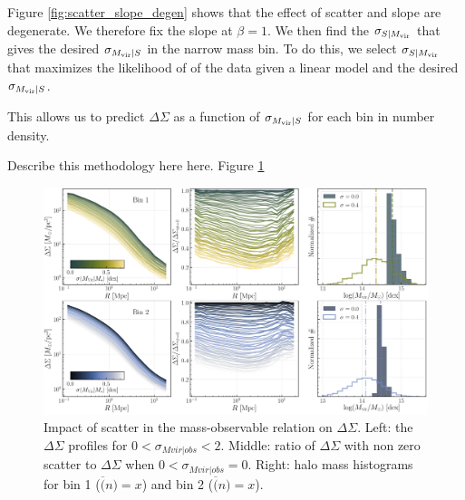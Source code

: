 \documentclass[a4paper,fleqn,usenatbib]{mnras}
\begin{document}
Figure \ref{fig:scatter_slope_degen} shows that the effect of scatter and slope are degenerate. We therefore fix the slope at $\beta = 1$. We then find the $\sigma_{S{} | M_{\rm vir}{}}$ that gives the desired $\sigma_{M_{\rm vir}{} | S{}}$ in the narrow mass bin. To do this, we select $\sigma_{S{} | M_{\rm vir}{}}$ that maximizes the likelihood of of the data given a linear model and the desired $\sigma_{M_{\rm vir}{} | S{}}$.

This allows us to predict $\Delta\Sigma$ as a function of $\sigma_{M_{\rm vir}{} | S{}}$ for each bin in number density.


Describe this methodology here here. Figure \ref{fig:mdpl2}

  \begin{figure}
      \centering 
      \includegraphics[width=\textwidth]{fig/png/mdpl2_dsigma_bin1_2}
      \caption{Impact of scatter in the mass-observable relation on $\Delta\Sigma$. Left: the $\Delta\Sigma$ profiles for $0<\sigma_{Mvir|obs}<2$. Middle: ratio of $\Delta\Sigma$ with non zero scatter to $\Delta\Sigma$ when $0<\sigma_{Mvir|obs}=0$. Right: halo mass histograms for bin 1 ($\overline(n)=x$) and bin 2 ($\overline(n)=x$). }
      \label{fig:mdpl2}
  \end{figure}
       
\end{document}
